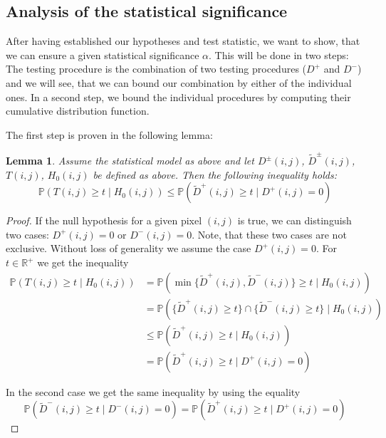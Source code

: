 \documentclass[a4paper,12pt]{article}
\theoremstyle{plain}
\newtheorem{lemma}[theorem]{Lemma}
\theoremstyle{definition}
\theoremstyle{remark}
\begin{document}
\newpage

\subsection{Analysis of the statistical significance}

After having established our hypotheses and test statistic, we want to show, that we can ensure a given statistical significance $\alpha$. This will be done in two steps: The testing procedure is the combination of two testing procedures ($D^+$ and $D^-$) and we will see, that we can bound our combination by either of the individual ones. In a second step, we bound the individual procedures by computing their cumulative distribution function.

The first step is proven in the following lemma:
\begin{lemma}\label{lemtypeIbound}
	Assume the statistical model as above and let $D^\pm(i, j)$, $\tilde{D}^\pm(i, j)$, $T(i, j)$, $H_0(i, j)$ be defined as above. Then the following inequality holds:
	\begin{equation}\label{eqtypeIbound}
		\mathbb{P}(T(i, j) \geq t \mid H_0(i, j)) \leq \mathbb{P}(\tilde{D}^+(i, j) \geq t \mid D^+(i, j) = 0)
	\end{equation}
\end{lemma}
\begin{proof}
	If the null hypothesis for a given pixel $(i, j)$ is true, we can distinguish two cases: $D^+(i, j) = 0$ or $D^-(i, j) = 0$. Note, that these two cases are not exclusive. Without loss of generality we assume the case $D^+(i, j) = 0$. For $t \in \mathbb{R}^+$ we get the inequality
	\begin{align*}
		\mathbb{P}(T(i, j) \geq t \mid H_0(i, j)) &= \mathbb{P}(\min \{ \tilde{D}^+(i, j), \tilde{D}^-(i, j) \} \geq t \mid H_0(i, j)) \\
		&= \mathbb{P}(\{ \tilde{D}^+(i, j) \geq t \} \cap \{ \tilde{D}^-(i, j) \geq t \} \mid H_0(i, j)) \\
		&\leq \mathbb{P}(\tilde{D}^+(i, j) \geq t \mid H_0(i, j)) \\
		&= \mathbb{P}(\tilde{D}^+(i, j) \geq t \mid D^+(i, j) = 0)
	\end{align*}
	
	In the second case we get the same inequality by using the equality
	\begin{equation*}
		\mathbb{P}(\tilde{D}^-(i, j) \geq t \mid D^-(i, j) = 0) = \mathbb{P}(\tilde{D}^+(i, j) \geq t \mid D^+(i, j) = 0)
	\end{equation*}
\end{proof}
\end{document}

